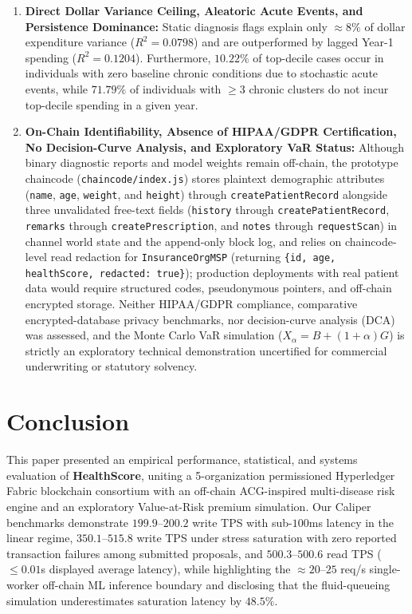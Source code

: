 \documentclass[runningheads]{llncs}
\begin{document}
\begin{enumerate}
    \item \textbf{Direct Dollar Variance Ceiling, Aleatoric Acute Events, and Persistence Dominance:} Static diagnosis flags explain only $\approx 8\%$ of dollar expenditure variance ($R^2 = 0.0798$) and are outperformed by lagged Year-1 spending ($R^2 = 0.1204$). Furthermore, $10.22\%$ of top-decile cases occur in individuals with zero baseline chronic conditions due to stochastic acute events, while $71.79\%$ of individuals with $\ge 3$ chronic clusters do not incur top-decile spending in a given year.
    \item \textbf{On-Chain Identifiability, Absence of HIPAA/GDPR Certification, No Decision-Curve Analysis, and Exploratory VaR Status:} Although binary diagnostic reports and model weights remain off-chain, the prototype chaincode (\texttt{chaincode/index.js}) stores plaintext demographic attributes (\texttt{name}, \texttt{age}, \texttt{weight}, and \texttt{height}) through \texttt{createPatientRecord} alongside three unvalidated free-text fields (\texttt{history} through \texttt{createPatientRecord}, \texttt{remarks} through \texttt{createPrescription}, and \texttt{notes} through \texttt{requestScan}) in channel world state and the append-only block log, and relies on chaincode-level read redaction for \texttt{InsuranceOrgMSP} (returning \texttt{\{id, age, healthScore, redacted: true\}}); production deployments with real patient data would require structured codes, pseudonymous pointers, and off-chain encrypted storage. Neither HIPAA/GDPR compliance, comparative encrypted-database privacy benchmarks, nor decision-curve analysis (DCA) was assessed, and the Monte Carlo VaR simulation ($X_\alpha = B + (1+\alpha)G$) is strictly an exploratory technical demonstration uncertified for commercial underwriting or statutory solvency.
\end{enumerate}

\section{Conclusion}
This paper presented an empirical performance, statistical, and systems evaluation of \textbf{HealthScore}, uniting a 5-organization permissioned Hyperledger Fabric blockchain consortium with an off-chain ACG-inspired multi-disease risk engine and an exploratory Value-at-Risk premium simulation. Our Caliper benchmarks demonstrate $199.9$--$200.2$ write TPS with sub-$100$ms latency in the linear regime, $350.1$--$515.8$ write TPS under stress saturation with zero reported transaction failures among submitted proposals, and $500.3$--$500.6$ read TPS ($\le 0.01$s displayed average latency), while highlighting the $\approx 20$--$25$ req/s single-worker off-chain ML inference boundary and disclosing that the fluid-queueing simulation underestimates saturation latency by $48.5\%$.
\end{document}
